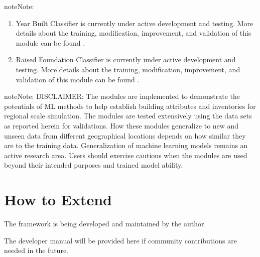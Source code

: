 \documentclass[letterpaper,10pt,english]{sphinxmanual}
\begin{document}
\begin{sphinxadmonition}{note}{Note:}\begin{enumerate}
%
\item {} 
\sphinxAtStartPar
Year Built Classifier is currently under active development and testing. More details about the training, modification, improvement, and validation of this module can be found .

\item {} 
\sphinxAtStartPar
Raised Foundation Classifier is currently under active development and testing. More details about the training, modification, improvement, and validation of this module can be found .

\end{enumerate}
\end{sphinxadmonition}

\begin{sphinxadmonition}{note}{Note:}
\sphinxAtStartPar
DISCLAIMER:
The modules are implemented to demonstrate the potentials of ML methods to help establish building attributes and inventories for regional scale simulation.
The modules are tested extensively using the data sets as reported herein for validations.
How these modules generalize to new and unseen data from different geographical locations depends on how similar they are to the training data.
Generalization of machine learning models remains an active research area.
Users should exercise cautions when the modules are used beyond their intended purposes and trained model ability.
\end{sphinxadmonition}
\label{\detokenize{index:lbl-developer-manual}}

\section{How to Extend}
\label{\detokenize{common/developer_manual/how_to_extend/how_to_extend:how-to-extend}}\label{\detokenize{common/developer_manual/how_to_extend/how_to_extend:lbl-how-to-extend}}\label{\detokenize{common/developer_manual/how_to_extend/how_to_extend::doc}}
\sphinxAtStartPar
The framework is being developed and maintained by the author.

\sphinxAtStartPar
The developer manual will be provided here if community contributions are needed in the future.
\end{document}
